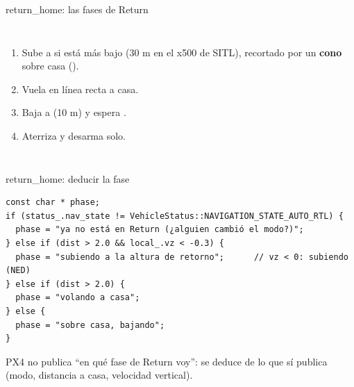 \begin{frame}{return\_home: las fases de Return}
  \begin{columns}[c]
    \centering
    \small
    \begin{enumerate}
      \item Sube a  si está más bajo (30 m en el x500 de SITL), recortado por un
        \textbf{cono} sobre casa ().
      \item Vuela en línea recta a casa.
      \item Baja a  (10 m) y espera .
      \item Aterriza y desarma solo.
    \end{enumerate}
  \end{columns}
\end{frame}

\begin{frame}[fragile]{return\_home: deducir la fase}
  \begin{lstlisting}[style=cpp,caption={return\_home.cpp}]
const char * phase;
if (status_.nav_state != VehicleStatus::NAVIGATION_STATE_AUTO_RTL) {
  phase = "ya no está en Return (¿alguien cambió el modo?)";
} else if (dist > 2.0 && local_.vz < -0.3) {
  phase = "subiendo a la altura de retorno";      // vz < 0: subiendo (NED)
} else if (dist > 2.0) {
  phase = "volando a casa";
} else {
  phase = "sobre casa, bajando";
}
  \end{lstlisting}
  \small PX4 no publica ``en qué fase de Return voy'': se deduce de lo que sí publica (modo, distancia a
  casa, velocidad vertical).
\end{frame}

